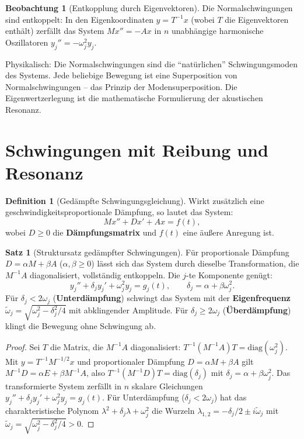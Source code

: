 ﻿\documentclass[a4paper,12pt]{report}
\theoremstyle{definition}
\newtheorem{definition}{Definition}
\newtheorem{satz}{Satz}
\newtheorem{beobachtung}{Beobachtung}
\begin{document}
\begin{beobachtung}[Entkopplung durch Eigenvektoren]
    Die Normalschwingungen sind entkoppelt: In den Eigenkoordinaten
    $y = T^{-1}x$ (wobei $T$ die Eigenvektoren enthält) zerfällt das
    System $M x'' = -Ax$ in $n$ unabhängige harmonische Oszillatoren
    $y_j'' = -\omega_j^2 y_j$.

    Physikalisch: Die Normalschwingungen sind die ``natürlichen''
    Schwingungsmoden des Systems. Jede beliebige Bewegung ist eine
    Superposition von Normalschwingungen -- das Prinzip der
    Modensuperposition. Die Eigenwertzerlegung ist die mathematische
    Formulierung der akustischen Resonanz.
\end{beobachtung}

\section{Schwingungen mit Reibung und Resonanz}

\begin{definition}[Gedämpfte Schwingungsgleichung]
    Wirkt zusätzlich eine geschwindigkeitsproportionale Dämpfung, so
    lautet das System:
    \[
        M x'' + D x' + A x = f(t),
    \]
    wobei $D \geq 0$ die \textbf{Dämpfungsmatrix} und $f(t)$ eine
    äußere Anregung ist.
\end{definition}

\begin{satz}[Struktursatz gedämpfter Schwingungen]
    Für proportionale Dämpfung $D = \alpha M + \beta A$ ($\alpha, \beta \geq 0$)
    lässt sich das System durch dieselbe Transformation, die $M^{-1}A$
    diagonalisiert, vollständig entkoppeln. Die $j$-te Komponente genügt:
    \[
        y_j'' + \delta_j y_j' + \omega_j^2 y_j = g_j(t),
        \qquad \delta_j = \alpha + \beta \omega_j^2.
    \]
    Für $\delta_j < 2\omega_j$ (\textbf{Unterdämpfung}) schwingt das
    System mit der \textbf{Eigenfrequenz} $\tilde{\omega}_j =
    \sqrt{\omega_j^2 - \delta_j^2/4}$ mit abklingender Amplitude.
    Für $\delta_j \geq 2\omega_j$ (\textbf{Überdämpfung}) klingt die
    Bewegung ohne Schwingung ab.
\end{satz}
\begin{proof}
    Sei $T$ die Matrix, die $M^{-1}A$ diagonalisiert: $T^{-1}(M^{-1}A)T = \mathrm{diag}(\omega_j^2)$.
    Mit $y = T^{-1} M^{-1/2} x$ und proportionaler Dämpfung $D = \alpha M + \beta A$
    gilt $M^{-1}D = \alpha E + \beta M^{-1}A$, also $T^{-1}(M^{-1}D)T = \mathrm{diag}(\delta_j)$
    mit $\delta_j = \alpha + \beta \omega_j^2$.
    Das transformierte System zerfällt in $n$ skalare Gleichungen
    $y_j'' + \delta_j y_j' + \omega_j^2 y_j = g_j(t)$.
    Für Unterdämpfung ($\delta_j < 2\omega_j$) hat das charakteristische Polynom
    $\lambda^2 + \delta_j \lambda + \omega_j^2$ die Wurzeln
    $\lambda_{1,2} = -\delta_j/2 \pm i\tilde{\omega}_j$ mit
    $\tilde{\omega}_j = \sqrt{\omega_j^2 - \delta_j^2/4} > 0$.
\end{proof}
\end{document}
